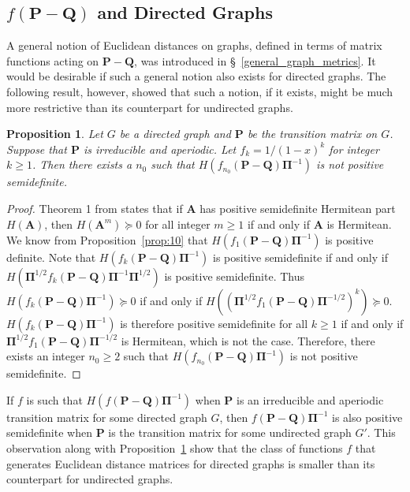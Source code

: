 \documentclass[10pt,twocolumn]{article}
\newtheorem{proposition}[theorem]{Proposition}
\numberwithin{equation}{section}
\begin{document}
\subsection{$f(\mathbf{P} - \mathbf{Q})$ and Directed Graphs}
\label{sec:fmathbfp-mathbfq-dir}
A general notion of Euclidean distances on graphs, defined in terms of
matrix functions acting on $\mathbf{P} - \mathbf{Q}$, was introduced
in \S~\ref{general_graph_metrics}. It would be desirable if such a
general notion also exists for directed graphs. The following result,
however, showed that such a notion, if it exists, might be much more
restrictive than its counterpart for undirected graphs.
\begin{proposition}
  \label{prop:12}
  Let $G$ be a directed graph and $\mathbf{P}$ be the transition
  matrix on $G$. Suppose that $\mathbf{P}$ is irreducible and
  aperiodic. Let $f_k = 1/(1-x)^{k}$ for integer $k \geq 1$. Then
  there exists a $n_0$ such that $H(f_{n_0}(\mathbf{P}
  - \mathbf{Q})\bm{\Pi}^{-1})$ is not positive semidefinite.
\end{proposition}
\begin{proof}
  Theorem 1 from \cite{johnson75:_power_matric_posit_defin_real_part}
  states that if $\mathbf{A}$ has positive semidefinite Hermitean part
  $H(\mathbf{A})$, then $H(\mathbf{A}^{m}) \succeq 0$ for all integer
  $m \geq 1$ if and only if $\mathbf{A}$ is Hermitean. We know from
  Proposition~\ref{prop:10} that $H(f_1(\mathbf{P} -
  \mathbf{Q})\bm{\Pi}^{-1})$ is positive definite. Note that
  $H(f_{k}(\mathbf{P} - \mathbf{Q})\bm{\Pi}^{-1})$ is positive
  semidefinite if and only if $H(\bm{\Pi}^{1/2}f_{k}(\mathbf{P} -
  \mathbf{Q}) \bm{\Pi}^{-1} \bm{\Pi}^{1/2})$ is positive
  semidefinite. Thus $H(f_{k}(\mathbf{P} - \mathbf{Q})\bm{\Pi}^{-1})
  \succeq 0$ if and only if $H((\bm{\Pi}^{1/2}f_{1}(\mathbf{P} -
  \mathbf{Q})\bm{\Pi}^{-1/2})^{k}) \succeq 0$.  $H(f_{k}(\mathbf{P} -
  \mathbf{Q})\bm{\Pi}^{-1})$ is therefore positive semidefinite for
  all $k \geq 1$ if and only if $\bm{\Pi}^{1/2}f_{1}(\mathbf{P} -
  \mathbf{Q})\bm{\Pi}^{-1/2}$ is Hermitean, which is not the
  case. Therefore, there exists an integer $n_0 \geq 2$ such that
  $H(f_{n_0}(\mathbf{P} - \mathbf{Q})\bm{\Pi}^{-1})$ is not positive
  semidefinite.
\end{proof}
If $f$ is such that $H(f(\mathbf{P} - \mathbf{Q})\bm{\Pi}^{-1})$
when $\mathbf{P}$ is an irreducible and aperiodic transition
matrix for some directed graph $G$, then $f(\mathbf{P} -
\mathbf{Q})\bm{\Pi}^{-1}$ is also positive semidefinite
when $\mathbf{P}$ is the transition matrix for some undirected
graph $G'$. This observation along with Proposition~\ref{prop:12} show
that the class of functions $f$ that generates Euclidean distance
matrices for directed graphs is smaller than its counterpart
for undirected graphs.
\end{document}
